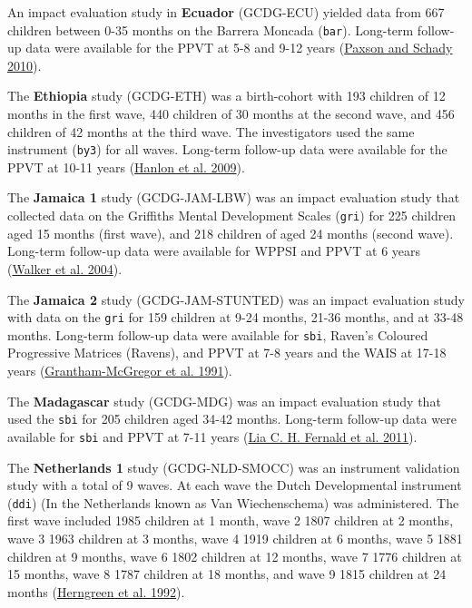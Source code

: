 \documentclass[
]{book}
\begin{document}
An impact evaluation study in \textbf{Ecuador} (GCDG-ECU) yielded data from 667 children between 0-35 months on the Barrera Moncada (\texttt{bar}). Long-term follow-up data were available for the PPVT at 5-8 and 9-12 years (\protect\hyperlink{ref-Paxson2010}{Paxson and Schady 2010}).

The \textbf{Ethiopia} study (GCDG-ETH) was a birth-cohort with 193 children of 12 months in the first wave, 440 children of 30 months at the second wave, and 456 children of 42 months at the third wave. The investigators used the same instrument (\texttt{by3}) for all waves. Long-term follow-up data were available for the PPVT at 10-11 years (\protect\hyperlink{ref-Hanlon2009}{Hanlon et al. 2009}).

The \textbf{Jamaica 1} study (GCDG-JAM-LBW) was an impact evaluation study that collected data on the Griffiths Mental Development Scales (\texttt{gri}) for 225 children aged 15 months (first wave), and 218 children of aged 24 months (second wave). Long-term follow-up data were available for WPPSI and PPVT at 6 years (\protect\hyperlink{ref-Walker2004}{Walker et al. 2004}).

The \textbf{Jamaica 2} study (GCDG-JAM-STUNTED) was an impact evaluation study with data on the \texttt{gri} for 159 children at 9-24 months, 21-36 months, and at 33-48 months. Long-term follow-up data were available for \texttt{sbi}, Raven's Coloured Progressive Matrices (Ravens), and PPVT at 7-8 years and the WAIS at 17-18 years (\protect\hyperlink{ref-Grantham-McGregor1991}{Grantham-McGregor et al. 1991}).

The \textbf{Madagascar} study (GCDG-MDG) was an impact evaluation study that used the \texttt{sbi} for 205 children aged 34-42 months. Long-term follow-up data were available for \texttt{sbi} and PPVT at 7-11 years (\protect\hyperlink{ref-Fernald2011}{Lia C. H. Fernald et al. 2011}).

The \textbf{Netherlands 1} study (GCDG-NLD-SMOCC) was an instrument validation study with a total of 9 waves. At each wave the Dutch Developmental instrument (\texttt{ddi}) (In the Netherlands known as Van Wiechenschema) was administered. The first wave included 1985 children at 1 month, wave 2 1807 children at 2 months, wave 3 1963 children at 3 months, wave 4 1919 children at 6 months, wave 5 1881 children at 9 months, wave 6 1802 children at 12 months, wave 7 1776 children at 15 months, wave 8 1787 children at 18 months, and wave 9 1815 children at 24 months (\protect\hyperlink{ref-herngreen1992}{Herngreen et al. 1992}).
\end{document}
